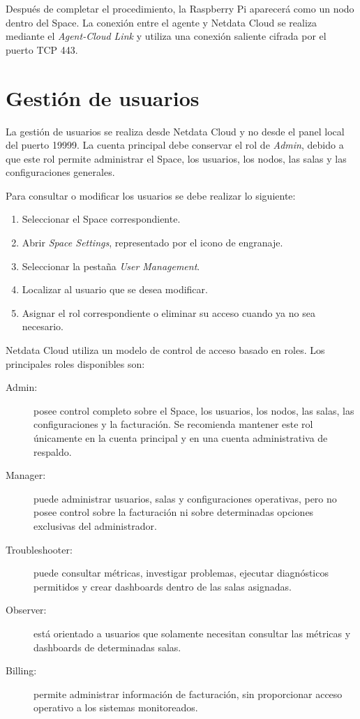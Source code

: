 Después de completar el procedimiento, la Raspberry Pi aparecerá como un nodo dentro
del Space. La conexión entre el agente y Netdata Cloud se realiza mediante el
\textit{Agent-Cloud Link} y utiliza una conexión saliente cifrada por el puerto TCP 443.

\section{Gestión de usuarios}

La gestión de usuarios se realiza desde Netdata Cloud y no desde el panel local del
puerto 19999. La cuenta principal debe conservar el rol de \textit{Admin}, debido a que
este rol permite administrar el Space, los usuarios, los nodos, las salas y las
configuraciones generales.

Para consultar o modificar los usuarios se debe realizar lo siguiente:

\begin{enumerate}
    \item Seleccionar el Space correspondiente.
    \item Abrir \textit{Space Settings}, representado por el icono de engranaje.
    \item Seleccionar la pestaña \textit{User Management}.
    \item Localizar al usuario que se desea modificar.
    \item Asignar el rol correspondiente o eliminar su acceso cuando ya no sea necesario.
\end{enumerate}

Netdata Cloud utiliza un modelo de control de acceso basado en roles. Los principales
roles disponibles son:

\begin{description}
    \item[Admin:] posee control completo sobre el Space, los usuarios, los nodos, las
    salas, las configuraciones y la facturación. Se recomienda mantener este rol
    únicamente en la cuenta principal y en una cuenta administrativa de respaldo.

    \item[Manager:] puede administrar usuarios, salas y configuraciones operativas, pero
    no posee control sobre la facturación ni sobre determinadas opciones exclusivas del
    administrador.

    \item[Troubleshooter:] puede consultar métricas, investigar problemas, ejecutar
    diagnósticos permitidos y crear dashboards dentro de las salas asignadas.

    \item[Observer:] está orientado a usuarios que solamente necesitan consultar las
    métricas y dashboards de determinadas salas.

    \item[Billing:] permite administrar información de facturación, sin proporcionar
    acceso operativo a los sistemas monitoreados.
\end{description}

